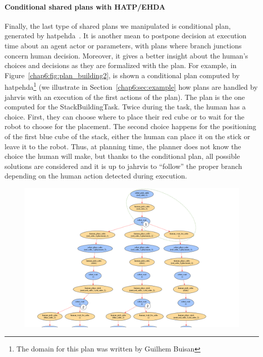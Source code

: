 \documentclass[a4paper,11pt,twoside]{StyleThese}
\begin{document}
\paragraph{Conditional shared plans with HATP/EHDA}
Finally, the last type of shared plans we manipulated is conditional plan, generated by \acrfull{hatpehda}~\citep{buisan_2021_human}. It is another mean to postpone decision at execution time about an agent actor or parameters, with plans where branch junctions concern human decision. Moreover, it gives a better insight about the human's choices and decisions as they are formalized with the plan. For example, in Figure~\ref{chap6:fig:plan_building2}, is shown a conditional plan computed by \acrshort{hatpehda}\footnote{The domain for this plan was written by Guilhem Buisan} (we illustrate in Section~\ref{chap6:sec:example} how plans are handled by \acrshort{jahrvis} with an execution of the first actions of the plan). The plan is the one computed for the StackBuildingTask. Twice during the task, the human has a choice. First, they can choose where to place their red cube or to wait for the robot to choose for the placement. The second choice happens for the positioning of the first blue cube of the stack, either the human can place it on the stick or leave it to the robot. Thus, at planning time, the planner does not know the choice the human will make, but thanks to the conditional plan, all possible solutions are considered and it is up to \acrshort{jahrvis} to ``follow'' the proper branch depending on the human action detected during execution.

\begin{landscape}
	\thispagestyle{example}
	\begin{figure}[!hp]
		\centering
		\includegraphics[scale=0.35]{figures/chapter2/plan_building.png}
	\end{figure}
\end{landscape}
\end{document}
